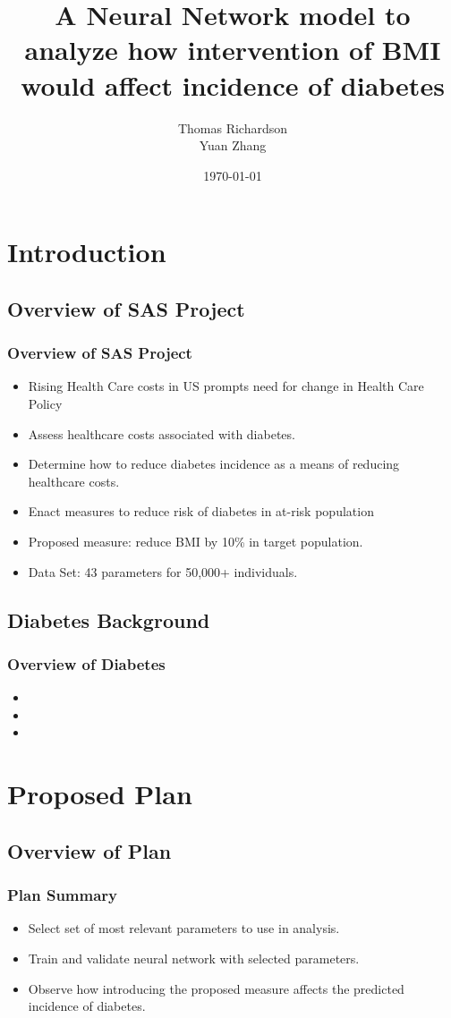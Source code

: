\documentclass{beamer}
\title{A Neural Network model to analyze how intervention of BMI would affect incidence of diabetes }
\author{Thomas Richardson\\
 Yuan Zhang}
\date{\today}
\begin{document}
\frame{\titlepage}

\section[Outline]{}
\frame{\tableofcontents}

\section{Introduction}
\subsection{Overview of SAS Project}
\frame
{
  \frametitle{Overview of SAS Project}

  \begin{itemize}
  \item {Rising Health Care costs in US prompts need for change in Health Care Policy}
  \item {Assess healthcare costs associated with diabetes.}
  \item {Determine how to reduce diabetes incidence as a means of reducing healthcare costs.}
  \item {Enact measures to reduce risk of diabetes in at-risk population}
  \item{Proposed measure:  reduce BMI by 10\%  in target population. }
  \item{Data Set:  43 parameters for 50,000+ individuals.}
  \end{itemize}
}
\subsection{Diabetes Background}
\frame
{
  \frametitle{Overview of Diabetes}

  \begin{itemize}
  \item {}
  \item {}
  \item {}
  \end{itemize}
 
}
\section{Proposed Plan}
\subsection{Overview of Plan}
\frame
{
\frametitle{Plan Summary}

  \begin{itemize}
  \item {Select set of most relevant parameters to use in analysis.}
  \item {Train and validate neural network with selected parameters.}
  \item {Observe how introducing the proposed measure affects the predicted incidence of diabetes.}
  \end{itemize}
}
\end{document}

